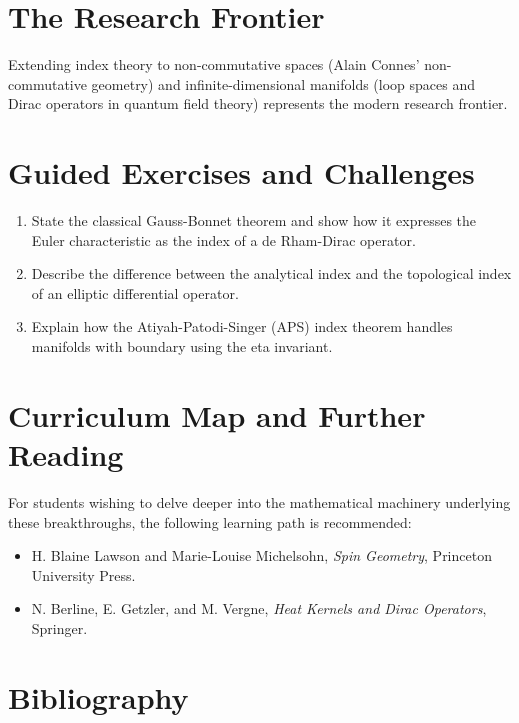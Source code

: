 \section{The Research Frontier}
Extending index theory to non-commutative spaces (Alain Connes' non-commutative geometry) and infinite-dimensional manifolds (loop spaces and Dirac operators in quantum field theory) represents the modern research frontier.

\section{Guided Exercises and Challenges}
\begin{enumerate}[label=\textbf{\arabic*.}]
  \item State the classical Gauss-Bonnet theorem and show how it expresses the Euler characteristic as the index of a de Rham-Dirac operator.
  \item Describe the difference between the analytical index and the topological index of an elliptic differential operator.
  \item Explain how the Atiyah-Patodi-Singer (APS) index theorem handles manifolds with boundary using the eta invariant.
\end{enumerate}

\section{Curriculum Map and Further Reading}
For students wishing to delve deeper into the mathematical machinery underlying these breakthroughs, the following learning path is recommended:
\begin{itemize}
  \item H. Blaine Lawson and Marie-Louise Michelsohn, \emph{Spin Geometry}, Princeton University Press.
  \item N. Berline, E. Getzler, and M. Vergne, \emph{Heat Kernels and Dirac Operators}, Springer.
\end{itemize}

\section*{Bibliography}

